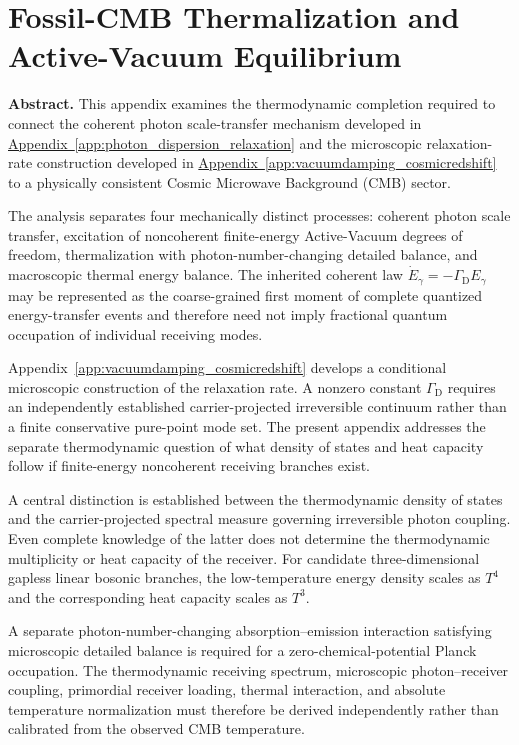 \chapter{Fossil-CMB Thermalization and Active-Vacuum Equilibrium}
\label{app:cmb_thermal_completion}

\noindent\textbf{Abstract.}
This appendix examines the thermodynamic completion required to connect the
coherent photon scale-transfer mechanism developed in
\hyperref[app:photon_dispersion_relaxation]{Appendix~\ref*{app:photon_dispersion_relaxation}}
and the microscopic relaxation-rate construction developed in
\hyperref[app:vacuumdamping_cosmicredshift]{Appendix~\ref*{app:vacuumdamping_cosmicredshift}}
to a physically consistent Cosmic Microwave Background (CMB) sector.

The analysis separates four mechanically distinct processes:
coherent photon scale transfer, excitation of noncoherent finite-energy
Active-Vacuum degrees of freedom, thermalization with photon-number-changing
detailed balance, and macroscopic thermal energy balance. The inherited
coherent law
\(
\dot E_\gamma=-\Gamma_{\mathrm D}E_\gamma
\)
may be represented as the coarse-grained first moment of complete quantized
energy-transfer events and therefore need not imply fractional quantum
occupation of individual receiving modes.

Appendix~\ref{app:vacuumdamping_cosmicredshift} develops a conditional
microscopic construction of the relaxation rate. A nonzero constant
\(\Gamma_{\mathrm D}\) requires an independently established
carrier-projected irreversible continuum rather than a finite conservative
pure-point mode set. The present appendix addresses the separate
thermodynamic question of what density of states and heat capacity follow if
finite-energy noncoherent receiving branches exist.

A central distinction is established between the thermodynamic density of
states and the carrier-projected spectral measure governing irreversible
photon coupling. Even complete knowledge of the latter does not determine
the thermodynamic multiplicity or heat capacity of the receiver. For
candidate three-dimensional gapless linear bosonic branches, the
low-temperature energy density scales as \(T^4\) and the corresponding heat
capacity scales as \(T^3\).

A separate photon-number-changing absorption--emission interaction satisfying
microscopic detailed balance is required for a zero-chemical-potential Planck
occupation. The thermodynamic receiving spectrum, microscopic
photon--receiver coupling, primordial receiver loading, thermal interaction,
and absolute temperature normalization must therefore be derived
independently rather than calibrated from the observed CMB temperature.


